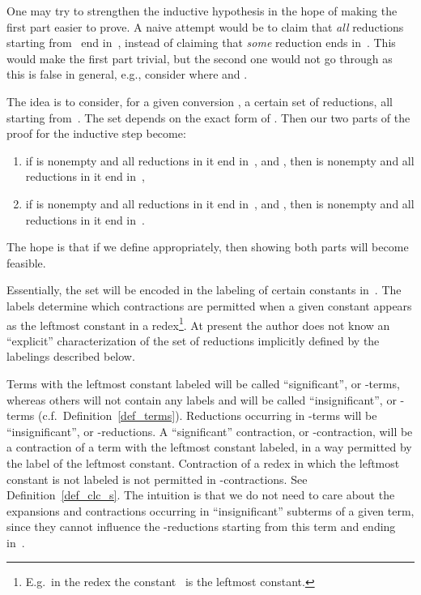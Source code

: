 \documentclass[a4paper,UKenglish]{lipics-v2016}
\begin{document}
One may try to strengthen the inductive hypothesis in the hope of
making the first part easier to prove. A naive attempt would be to
claim that \emph{all} reductions starting from~ end in~,
instead of claiming that \emph{some} reduction ends in~. This
would make the first part trivial, but the second one would not go
through as this is false in general, e.g., consider 
where  and
.

The idea is to consider, for a given conversion , a
certain set  of reductions, all starting
from~. The set  depends on the exact form of
. Then our two parts of the proof for the inductive
step become:
\begin{enumerate}
\item if  is nonempty and all reductions in it
  end in~, and , then
   is nonempty
  and all reductions in it end in~,
\item if  is nonempty and all reductions in it
  end in~, and , then
   is nonempty and all reductions
  in it end in~.
\end{enumerate}
The hope is that if we define  appropriately,
then showing both parts will become feasible.

Essentially, the set  will be encoded in the
labeling of certain constants in~. The labels determine which
contractions are permitted when a given constant appears as the
leftmost constant in a redex\footnote{E.g.~in the redex
   the constant~ is the leftmost constant.}. At
present the author does not know an ``explicit'' characterization of
the set of reductions  implicitly defined by the
labelings described below.

Terms with the leftmost constant labeled will be called
``significant'', or -terms, whereas others will not contain any
labels and will be called ``insignificant'', or -terms
(c.f.~Definition~\ref{def_terms}). Reductions occurring in -terms
will be ``insignificant'', or -reductions. A ``significant''
contraction, or -contraction, will be a contraction of a term with
the leftmost constant labeled, in a way permitted by the label of the
leftmost constant. Contraction of a redex in which the leftmost
constant is not labeled is not permitted in -contractions. See
Definition~\ref{def_clc_s}. The intuition is that we do not need to
care about the expansions and contractions occurring in
``insignificant'' subterms of a given term, since they cannot
influence the -reductions starting from this term and ending
in~.
\end{document}
